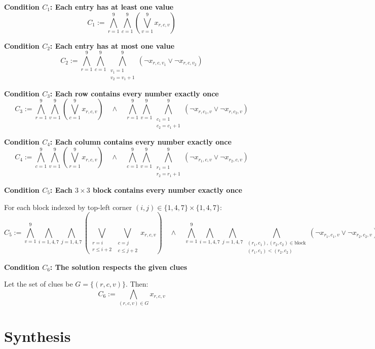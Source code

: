 \documentclass{article}
\theoremstyle{theorem}
\theoremstyle{definition}
\theoremstyle{remark}
\begin{document}
\begin{flushleft}
\textbf{Condition \( C_1 \): Each entry has at least one value}
\[
C_1 := \bigwedge_{r=1}^9 \bigwedge_{c=1}^9 \left( \bigvee_{v=1}^9 x_{r,c,v} \right)
\]

\textbf{Condition \( C_2 \): Each entry has at most one value}
\[
C_2 := \bigwedge_{r=1}^9 \bigwedge_{c=1}^9 \bigwedge_{\substack{v_1=1 \\ v_2 = v_1+1}}^9 \left( \neg x_{r,c,v_1} \lor \neg x_{r,c,v_2} \right)
\]

\textbf{Condition \( C_3 \): Each row contains every number exactly once}
\[
C_3 := \bigwedge_{r=1}^9 \bigwedge_{v=1}^9 \left( \bigvee_{c=1}^9 x_{r,c,v} \right) \quad \land \quad 
\bigwedge_{r=1}^9 \bigwedge_{v=1}^9 \bigwedge_{\substack{c_1=1 \\ c_2 = c_1+1}}^9 \left( \neg x_{r,c_1,v} \lor \neg x_{r,c_2,v} \right)
\]

\textbf{Condition \( C_4 \): Each column contains every number exactly once}
\[
C_4 := \bigwedge_{c=1}^9 \bigwedge_{v=1}^9 \left( \bigvee_{r=1}^9 x_{r,c,v} \right) \quad \land \quad 
\bigwedge_{c=1}^9 \bigwedge_{v=1}^9 \bigwedge_{\substack{r_1=1 \\ r_2 = r_1+1}}^9 \left( \neg x_{r_1,c,v} \lor \neg x_{r_2,c,v} \right)
\]

\textbf{Condition \( C_5 \): Each \( 3 \times 3 \) block contains every number exactly once}

For each block indexed by top-left corner \( (i,j) \in \{1,4,7\} \times \{1,4,7\} \):
\[
C_5 := \bigwedge_{v=1}^9 \bigwedge_{i=1,4,7} \bigwedge_{j=1,4,7} \left( \bigvee_{\substack{r=i \\ r \leq i+2}} \bigvee_{\substack{c=j \\ c \leq j+2}} x_{r,c,v} \right)
\quad \land \quad
\bigwedge_{v=1}^9 \bigwedge_{i=1,4,7} \bigwedge_{j=1,4,7} \bigwedge_{\substack{(r_1,c_1),(r_2,c_2) \in \text{block} \\ (r_1,c_1) < (r_2,c_2)}} \left( \neg x_{r_1,c_1,v} \lor \neg x_{r_2,c_2,v} \right)
\]

\textbf{Condition \( C_6 \): The solution respects the given clues}

Let the set of clues be \( G = \{(r,c,v)\} \). Then:
\[
C_6 := \bigwedge_{(r,c,v) \in G} x_{r,c,v}
\]
\end{flushleft}

\section{Synthesis}
\end{document}
